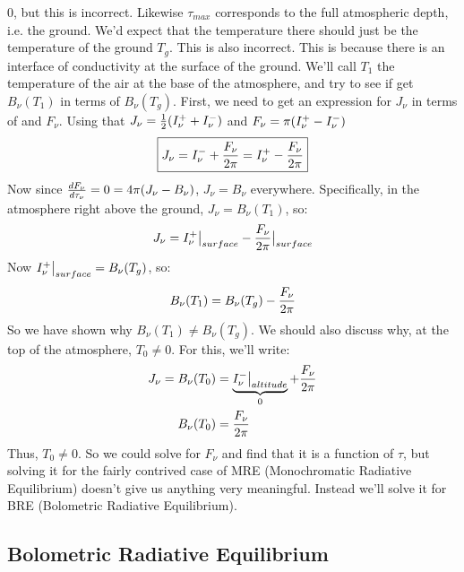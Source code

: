 \documentclass[11pt]{article}
\def\hf{{1 \over 2}}
\def\eval#1{\big|_{#1}}
\begin{document}
$0$, but this is incorrect.  Likewise $\tau_{max}$ corresponds to the
full atmospheric depth, i.e. the ground.  We'd expect that the temperature
there should just be the temperature of the ground $T_g$.  This is also
incorrect.  This is because there is an interface of conductivity at the
surface of the ground.  We'll call $T_1$ the temperature of the air at the
base of the atmosphere, and try to see if get $B_\nu(T_1)$ in terms of 
$B_\nu(T_g)$.  
First, we need to get an expression for $J_\nu$ in terms of 
and $F_\nu$.  Using that $J_\nu=\hf(\inp+\inm)$ and $F_\nu=\pi({I_\nu^+}-{I_\nu^-})$
$$\boxed{J_\nu={I_\nu^-}+{F_\nu\over2\pi}={I_\nu^+}-{F_\nu\over2\pi}}$$
Now since ${dF_\nu\over d\tau_\nu}=0=4\pi(J_\nu-B_\nu)$, $J_\nu=B_\nu$ everywhere.
Specifically, in the atmosphere right above the ground, $J_\nu=B_\nu(T_1)$, so:
$$J_\nu=\inp\eval{surface}-{F_\nu\over2\pi}\eval{surface}$$
Now $\inp\eval{surface}=B_\nu(T_g)$, so:
$$B_\nu(T_1)=B_\nu(T_g)-{F_\nu\over2\pi}$$
So we have shown why $B_\nu(T_1)\ne B_\nu(T_g)$.  We should also discuss why,
at the top of the atmosphere, $T_0\ne 0$.  For this, we'll write:
$$\begin{aligned}J_\nu=B_\nu(T_0)
&=\underbrace{\inm\eval{altitude}}_{0}+{F_\nu\over2\pi}\\ 
B_\nu(T_0)&={F_\nu\over2\pi}\\ \end{aligned}$$
Thus, $T_0\ne0$.  So we could solve for $F_\nu$ and find that it is a function
of $\tau$, but solving it for the fairly contrived case of MRE (Monochromatic
Radiative Equilibrium) doesn't give us anything very meaningful.  Instead we'll
solve it for BRE (Bolometric Radiative Equilibrium).

\subsection*{ Bolometric Radiative Equilibrium}
\end{document}
